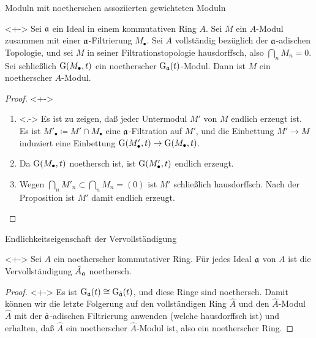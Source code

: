 \begin{frame}{Moduln mit noetherschen assoziierten gewichteten Moduln}
	\begin{corollary}<+->
		Sei \(\mathfrak{a}\) ein Ideal in einem kommutativen Ring \(A\). Sei \(M\) ein \(A\)-Modul zusammen mit
		einer \(\mathfrak{a}\)-Filtrierung \(M_\bullet\). Sei \(A\) vollständig bezüglich der \(\mathfrak{a}\)-adischen Topologie,
		und sei \(M\) in seiner Filtrationstopologie hausdorffsch, also \(\bigcap\limits_n M_n = 0\). Sei schließlich
		\(\operatorname{G}(M_\bullet, t)\) ein noetherscher \(\operatorname{G}_{\mathfrak{a}}(t)\)-Modul. Dann ist \(M\) ein noetherscher
		\(A\)-Modul.
	\end{corollary}
	\begin{proof}<+->
		\begin{enumerate}[<+->]
		\item<.->
			Es ist zu zeigen, daß jeder Untermodul \(M'\) von \(M\) endlich erzeugt ist. Es ist \(M'_\bullet \coloneqq
			M' \cap M_\bullet\) eine \(\mathfrak{a}\)-Filtration auf \(M'\), und die Einbettung \(M' \to M\) induziert
			eine Einbettung \(\operatorname{G}(M'_\bullet, t) \to \operatorname{G}(M_\bullet, t)\).
		\item
			Da \(\operatorname{G}(M_\bullet, t)\) noethersch ist, ist \(\operatorname{G}(M'_\bullet, t)\) endlich erzeugt.
		\item
			Wegen \(\bigcap\limits_n M'_n \subset \bigcap\limits_n M_n = (0)\) ist \(M'\) schließlich hausdorffsch.
			Nach der Proposition ist \(M'\) damit endlich erzeugt.
			\qedhere
		\end{enumerate}
	\end{proof}
\end{frame}

\begin{frame}{Endlichkeitseigenschaft der Vervollständigung}
	\begin{theorem}<+->
		\label{thm:compl_is_noeth}
		Sei \(A\) ein noetherscher kommutativer Ring. Für jedes Ideal \(\mathfrak{a}\) von \(A\) ist
		die Vervollständigung \(\hat A_{\mathfrak{a}}\) noethersch.
	\end{theorem}
	\begin{proof}<+->
		Es ist \(\operatorname{G}_{\mathfrak{a}}(t) \cong \operatorname{G}_{\hat {\mathfrak{a}}}(t)\), und diese Ringe sind noethersch.
		Damit können wir die letzte Folgerung auf den vollständigen Ring \(\hat A\) und den \(\hat A\)-Modul
		\(\hat A\) mit der \(\hat{\mathfrak{a}}\)-adischen Filtrierung anwenden (welche hausdorffsch ist) und erhalten,
		daß \(\hat A\) ein noetherscher \(\hat A\)-Modul ist, also ein noetherscher Ring.
	\end{proof}
\end{frame}

